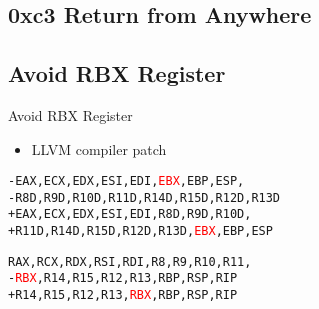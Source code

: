\documentclass[14pt]{beamer}
\begin{document}
\subsection{0xc3 Return from Anywhere}

\subsection{Avoid RBX Register}
\begin{frame}[fragile]{Avoid RBX Register}
\begin{itemize}
    \item LLVM compiler patch
\end{itemize}
\begin{alltt}
-EAX,ECX,EDX,ESI,EDI,\textcolor{red}{EBX},EBP,ESP,
-R8D,R9D,R10D,R11D,R14D,R15D,R12D,R13D
+EAX,ECX,EDX,ESI,EDI,R8D,R9D,R10D,
+R11D,R14D,R15D,R12D,R13D,\textcolor{red}{EBX},EBP,ESP
\end{alltt}
\begin{alltt}
 RAX,RCX,RDX,RSI,RDI,R8,R9,R10,R11,
-\textcolor{red}{RBX},R14,R15,R12,R13,RBP,RSP,RIP
+R14,R15,R12,R13,\textcolor{red}{RBX},RBP,RSP,RIP
\end{alltt}
\end{frame}
\end{document}
